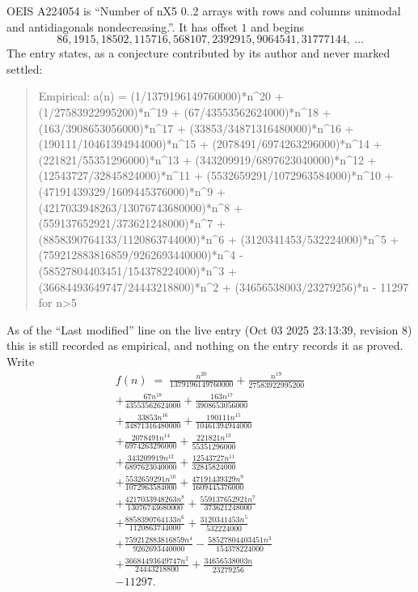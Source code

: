 \documentclass[11pt,a4paper]{article}
\theoremstyle{plain}
\theoremstyle{definition}
\begin{document}
OEIS A224054 is ``Number of nX5 0..2 arrays with rows and columns unimodal and antidiagonals nondecreasing.''. It has offset $1$ and begins
\[
86, 1915, 18502, 115716, 568107, 2392915, 9064541, 31777144,\ \dots
\]
The entry states, as a conjecture contributed by its author and never marked settled:
\begin{quote}\raggedright\small
Empirical: a(n) = (1/1379196149760000)*n\^{}20 + (1/27583922995200)*n\^{}19 + (67/43553562624000)*n\^{}18 + (163/3908653056000)*n\^{}17 + (33853/34871316480000)*n\^{}16 + (190111/10461394944000)*n\^{}15 + (2078491/6974263296000)*n\^{}14 + (221821/55351296000)*n\^{}13 + (343209919/6897623040000)*n\^{}12 + (12543727/32845824000)*n\^{}11 + (5532659291/1072963584000)*n\^{}10 + (47191439329/1609445376000)*n\^{}9 + (4217033948263/13076743680000)*n\^{}8 + (559137652921/373621248000)*n\^{}7 + (8858390764133/1120863744000)*n\^{}6 + (3120341453/532224000)*n\^{}5 + (759212883816859/9262693440000)*n\^{}4 - (58527804403451/154378224000)*n\^{}3 + (36684493649747/24443218800)*n\^{}2 + (34656538003/23279256)*n - 11297 for n>5
\end{quote}
As of the ``Last modified'' line on the live entry (Oct 03 2025 23:13:39, revision 8) this is still
recorded as empirical, and nothing on the entry records it as proved. Write
\begin{multline*}
f(n)\;=\;\frac{n^{20}}{1379196149760000} + \frac{n^{19}}{27583922995200} \\
+ \frac{67 n^{18}}{43553562624000} + \frac{163 n^{17}}{3908653056000} \\
+ \frac{33853 n^{16}}{34871316480000} + \frac{190111 n^{15}}{10461394944000} \\
+ \frac{2078491 n^{14}}{6974263296000} + \frac{221821 n^{13}}{55351296000} \\
+ \frac{343209919 n^{12}}{6897623040000} + \frac{12543727 n^{11}}{32845824000} \\
+ \frac{5532659291 n^{10}}{1072963584000} + \frac{47191439329 n^{9}}{1609445376000} \\
+ \frac{4217033948263 n^{8}}{13076743680000} + \frac{559137652921 n^{7}}{373621248000} \\
+ \frac{8858390764133 n^{6}}{1120863744000} + \frac{3120341453 n^{5}}{532224000} \\
+ \frac{759212883816859 n^{4}}{9262693440000} - \frac{58527804403451 n^{3}}{154378224000} \\
+ \frac{36684493649747 n^{2}}{24443218800} + \frac{34656538003 n}{23279256} \\
- 11297.
\end{multline*}
\end{document}
